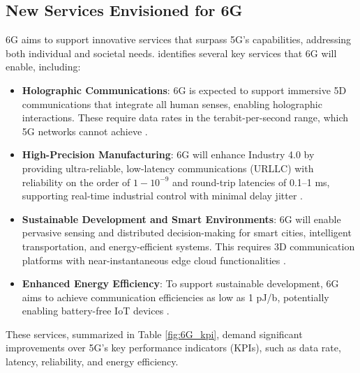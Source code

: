 \documentclass[acmtog]{acmart}
\begin{document}
\subsection{New Services Envisioned for 6G}

6G aims to support innovative services that surpass 5G's capabilities, addressing both individual and societal needs. \citet{ref4} identifies several key services that 6G will enable, including:

\begin{itemize}
  \item \textbf{Holographic Communications}: 6G is expected to support immersive 5D communications that integrate all human senses, enabling holographic interactions. These require data rates in the terabit-per-second range, which 5G networks cannot achieve \citep{ref4_1}.
  \item \textbf{High-Precision Manufacturing}: 6G will enhance Industry 4.0 by providing ultra-reliable, low-latency communications (URLLC) with reliability on the order of $1-10^{-9}$ and round-trip latencies of 0.1--1 ms, supporting real-time industrial control with minimal delay jitter \citep{ref4_2}.
  \item \textbf{Sustainable Development and Smart Environments}: 6G will enable pervasive sensing and distributed decision-making for smart cities, intelligent transportation, and energy-efficient systems. This requires 3D communication platforms with near-instantaneous edge cloud functionalities \citep{ref4}.
  \item \textbf{Enhanced Energy Efficiency}: To support sustainable development, 6G aims to achieve communication efficiencies as low as 1 pJ/b, potentially enabling battery-free IoT devices \citep{ref4_3}.
\end{itemize}

These services, summarized in Table \ref{fig:6G_kpi}, demand significant improvements over 5G's key performance indicators (KPIs), such as data rate, latency, reliability, and energy efficiency.
\end{document}
